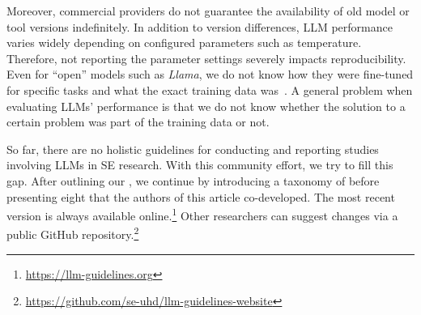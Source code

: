 Moreover, commercial providers do not guarantee the availability of old model or tool versions indefinitely.
In addition to version differences, LLM performance varies widely depending on configured parameters such as temperature.
Therefore, not reporting the parameter settings severely impacts reproducibility.
Even for ``open'' models such as \emph{Llama}, we do not know how they were fine-tuned for specific tasks and what the exact training data was~\cite{Gibney2024}.
A general problem when evaluating LLMs' performance is that we do not know whether the solution to a certain problem was part of the training data or not.

So far, there are no holistic guidelines for conducting and reporting studies involving LLMs in SE research.
With this community effort, we try to fill this gap.
After outlining our \scope, we continue by introducing a taxonomy of \studytypes before presenting eight \guidelines that the authors of this article co-developed.
The most recent version is always available online.\footnote{\url{https://llm-guidelines.org}}
Other researchers can suggest changes via a public GitHub repository.\footnote{\url{https://github.com/se-uhd/llm-guidelines-website}}
